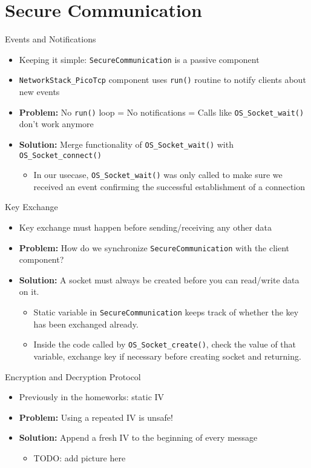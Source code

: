 \section{Secure Communication}

\begin{frame}{Events and Notifications}
\begin{itemize}
\item Keeping it simple: \texttt{SecureCommunication} is a passive component
\item \texttt{NetworkStack\_PicoTcp} component uses \texttt{run()} routine to notify clients about new events
\item \textbf{Problem:}  No \texttt{run()} loop = No notifications = Calls like \texttt{OS\_Socket\_wait()} don't work anymore
\item \textbf{Solution:} Merge functionality of \texttt{OS\_Socket\_wait()} with \texttt{OS\_Socket\_connect()}
    \begin{itemize}
    \item In our usecase, \texttt{OS\_Socket\_wait()} was only called to make sure we received an event confirming the successful establishment of a connection
    \end{itemize}
\end{itemize}
\end{frame}

\begin{frame}{Key Exchange}
\begin{itemize}
\item Key exchange must happen before sending/receiving any other data
\item \textbf{Problem:} How do we synchronize \texttt{SecureCommunication} with the client component?
\item \textbf{Solution:} A socket must always be created before you can read/write data on it.
    \begin{itemize}
    \item Static variable in \texttt{SecureCommunication} keeps track of whether the key has been exchanged already.
    \item Inside the code called by \texttt{OS\_Socket\_create()}, check the value of that variable, exchange key if necessary before creating socket and returning.
    \end{itemize}
\end{itemize}
\end{frame}

\begin{frame}{Encryption and Decryption Protocol}
\begin{itemize}
\item Previously in the homeworks: static IV
\item \textbf{Problem:} Using a repeated IV is unsafe!
\item \textbf{Solution:} Append a fresh IV to the beginning of every message
    \begin{itemize}
    \item TODO: add picture here
    \end{itemize}
\end{itemize}
\end{frame}